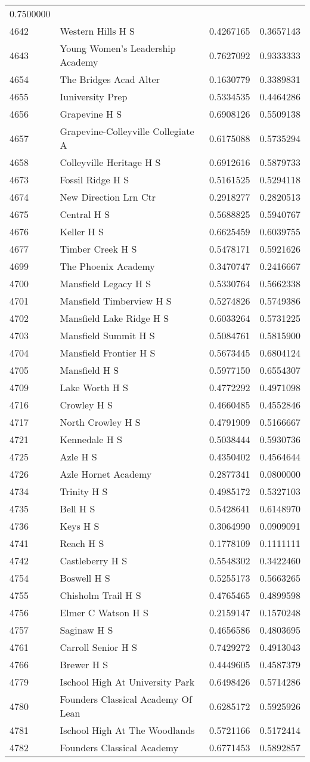 \documentclass[
]{article}
\begin{document}
\begin{longtable}[]{@{}llrr@{}}
0.7500000\tabularnewline
4642 & Western Hills H S & 0.4267165 & 0.3657143\tabularnewline
4643 & Young Women's Leadership Academy & 0.7627092 &
0.9333333\tabularnewline
4654 & The Bridges Acad Alter & 0.1630779 & 0.3389831\tabularnewline
4655 & Iuniversity Prep & 0.5334535 & 0.4464286\tabularnewline
4656 & Grapevine H S & 0.6908126 & 0.5509138\tabularnewline
4657 & Grapevine-Colleyville Collegiate A & 0.6175088 &
0.5735294\tabularnewline
4658 & Colleyville Heritage H S & 0.6912616 & 0.5879733\tabularnewline
4673 & Fossil Ridge H S & 0.5161525 & 0.5294118\tabularnewline
4674 & New Direction Lrn Ctr & 0.2918277 & 0.2820513\tabularnewline
4675 & Central H S & 0.5688825 & 0.5940767\tabularnewline
4676 & Keller H S & 0.6625459 & 0.6039755\tabularnewline
4677 & Timber Creek H S & 0.5478171 & 0.5921626\tabularnewline
4699 & The Phoenix Academy & 0.3470747 & 0.2416667\tabularnewline
4700 & Mansfield Legacy H S & 0.5330764 & 0.5662338\tabularnewline
4701 & Mansfield Timberview H S & 0.5274826 & 0.5749386\tabularnewline
4702 & Mansfield Lake Ridge H S & 0.6033264 & 0.5731225\tabularnewline
4703 & Mansfield Summit H S & 0.5084761 & 0.5815900\tabularnewline
4704 & Mansfield Frontier H S & 0.5673445 & 0.6804124\tabularnewline
4705 & Mansfield H S & 0.5977150 & 0.6554307\tabularnewline
4709 & Lake Worth H S & 0.4772292 & 0.4971098\tabularnewline
4716 & Crowley H S & 0.4660485 & 0.4552846\tabularnewline
4717 & North Crowley H S & 0.4791909 & 0.5166667\tabularnewline
4721 & Kennedale H S & 0.5038444 & 0.5930736\tabularnewline
4725 & Azle H S & 0.4350402 & 0.4564644\tabularnewline
4726 & Azle Hornet Academy & 0.2877341 & 0.0800000\tabularnewline
4734 & Trinity H S & 0.4985172 & 0.5327103\tabularnewline
4735 & Bell H S & 0.5428641 & 0.6148970\tabularnewline
4736 & Keys H S & 0.3064990 & 0.0909091\tabularnewline
4741 & Reach H S & 0.1778109 & 0.1111111\tabularnewline
4742 & Castleberry H S & 0.5548302 & 0.3422460\tabularnewline
4754 & Boswell H S & 0.5255173 & 0.5663265\tabularnewline
4755 & Chisholm Trail H S & 0.4765465 & 0.4899598\tabularnewline
4756 & Elmer C Watson H S & 0.2159147 & 0.1570248\tabularnewline
4757 & Saginaw H S & 0.4656586 & 0.4803695\tabularnewline
4761 & Carroll Senior H S & 0.7429272 & 0.4913043\tabularnewline
4766 & Brewer H S & 0.4449605 & 0.4587379\tabularnewline
4779 & Ischool High At University Park & 0.6498426 &
0.5714286\tabularnewline
4780 & Founders Classical Academy Of Lean & 0.6285172 &
0.5925926\tabularnewline
4781 & Ischool High At The Woodlands & 0.5721166 &
0.5172414\tabularnewline
4782 & Founders Classical Academy & 0.6771453 & 0.5892857\tabularnewline

\end{longtable}
\end{document}
